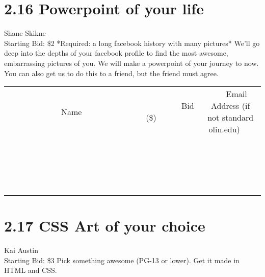 \documentclass[11pt]{article}
\begin{document}
\section*{2.16 Powerpoint of your life}
Shane Skikne
\\
Starting Bid: \$2
\newline
*Required: a long facebook history with many pictures* We'll go deep into the depths of your facebook profile to find the most awesome, embarrassing  pictures of you. We will make a powerpoint of your journey to now. You can also get us to do this to a friend, but the friend  must agree.
\\[3ex]
\begin{tabular}{c c c}
~~~~~~~~~~~~~Name~~~~~~~~~~~~~ & ~~~~~~~~~Bid (\$)~~~~~~~~~  & ~~~Email Address (if not standard olin.edu)~~~\\
 & & \\
\hline
 & & \\
\hline
 & & \\
\hline
 & & \\
\hline
 & & \\
\hline
 & & \\
\hline
 & & \\
\hline
 & & \\
\hline
 & & \\
\hline
 & & \\
\hline
 & & \\
\hline
 & & \\
\hline
 & & \\
\hline
 & & \\
\hline
 & & \\
\hline
 & & \\
\hline
 & & \\
\hline
 & & \\
\hline
 & & \\
\hline
\end{tabular}
\newpage
\section*{2.17 CSS Art of your choice}
Kai Austin
\\
Starting Bid: \$3
\newline
Pick something awesome (PG-13 or lower). Get it made in HTML and CSS.
\end{document}
